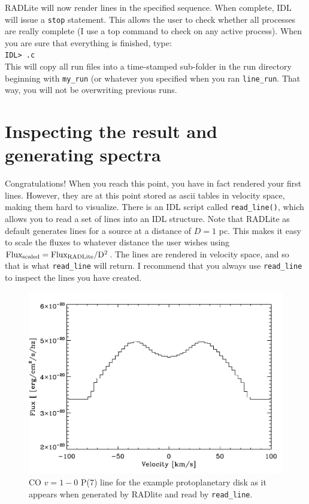 \documentclass[11pt]{article}
\begin{document}
\begin{itemize}
RADLite will now render lines in the specified sequence. When complete, IDL will issue a {\tt stop} statement. This allows the user to check
whether all processes are really complete (I use a top command to check on any active process). When you are sure that everything
is finished, type:\\
{\tt IDL> .c }\\

This will copy all run files into a time-stamped sub-folder in the run directory beginning with {\tt my\_run} (or whatever you specified when
you ran {\tt line\_run}. That way, you will not be overwriting previous runs. 

\end{itemize}

\section{Inspecting the result and generating spectra}

Congratulations! When you reach this point, you have in fact rendered your first lines. However, they are at this point stored as ascii tables in
velocity space, making them hard to visualize. There is an IDL script called {\tt read\_line()}, which allows you to read a 
set of lines into an IDL structure. Note that RADLite as default generates lines for a source at a distance of $D=1$ pc.
This makes it easy to scale the fluxes to whatever distance the user wishes using $\rm Flux_{scaled} = Flux_{RADLite}/D^2$.
The lines are rendered in velocity space, and so that is what {\tt read\_line} will return. 
I recommend that you always use {\tt read\_line} to inspect the lines you have created. 

\begin{figure}
\centering
\includegraphics[width=12cm]{CO_exampleline.pdf}
\caption{CO $v=1-0$ P(7) line for the example protoplanetary disk as it appears when generated by RADlite and read by {\tt read\_line}. }
\end{figure}
\end{document}
